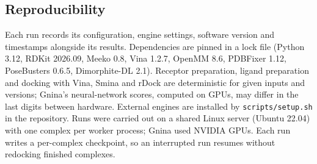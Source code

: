 \subsection{Reproducibility}

Each run records its configuration, engine settings, software version and timestamps
alongside its results. Dependencies are pinned in a lock file (Python 3.12, RDKit 2026.09,
Meeko 0.8, Vina 1.2.7, OpenMM 8.6, PDBFixer 1.12, PoseBusters 0.6.5, Dimorphite-DL 2.1).
Receptor preparation, ligand preparation and docking with Vina, Smina and rDock are
deterministic for given inputs and versions; Gnina's neural-network scores, computed on
GPUs, may differ in the last digits between hardware. External engines are installed by \texttt{scripts/setup.sh} in the repository.
Runs were carried out on a shared Linux server (Ubuntu 22.04) with one complex per worker
process; Gnina used NVIDIA GPUs. Each run writes a per-complex checkpoint, so an interrupted
run resumes without redocking finished complexes.
